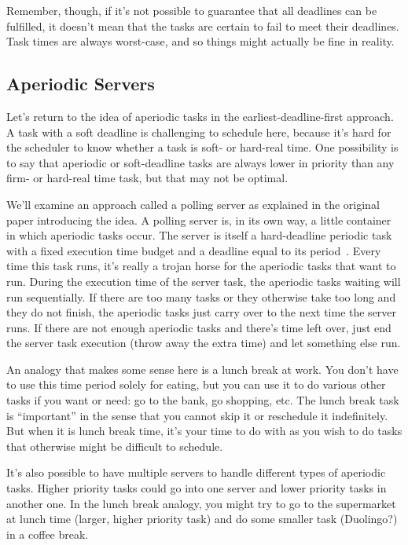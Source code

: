 Remember, though, if it's not possible to guarantee that all deadlines can be fulfilled, it doesn't mean that the tasks are certain to fail to meet their deadlines. Task times are always worst-case, and so things might actually be fine in reality.

\subsection*{Aperiodic Servers}
Let's return to the idea of aperiodic tasks in the earliest-deadline-first approach. A task with a soft deadline is challenging to schedule here, because it's hard for the scheduler to know whether a task is soft- or hard-real time. One possibility is to say that aperiodic or soft-deadline tasks are always lower in priority than any firm- or hard-real time task, but that may not be optimal. 

We'll examine an approach called a polling server as explained in the original paper introducing the idea. A polling server is, in its own way, a little container in which aperiodic tasks occur. The server is itself a hard-deadline periodic task with a fixed execution time budget and a deadline equal to its period~\cite{aperiodic-server}. Every time this task runs, it's really a trojan horse for the aperiodic tasks that want to run. During the execution time of the server task, the aperiodic tasks waiting will run sequentially. If there are too many tasks or they otherwise take too long and they do not finish, the aperiodic tasks just carry over to the next time the server runs. If there are not enough aperiodic tasks and there's time left over, just end the server task execution (throw away the extra time) and let something else run.

An analogy that makes some sense here is a lunch break at work. You don't have to use this time period solely for eating, but you can use it to do various other tasks if you want or need: go to the bank, go shopping, etc. The lunch break task is ``important'' in the sense that you cannot skip it or reschedule it indefinitely. But when it is lunch break time, it's your time to do with as you wish to do tasks that otherwise might be difficult to schedule.

It's also possible to have multiple servers to handle different types of aperiodic tasks. Higher priority tasks could go into one server and lower priority tasks in another one. In the lunch break analogy, you might try to go to the supermarket at lunch time (larger, higher priority task) and do some smaller task (Duolingo?) in a coffee break.

